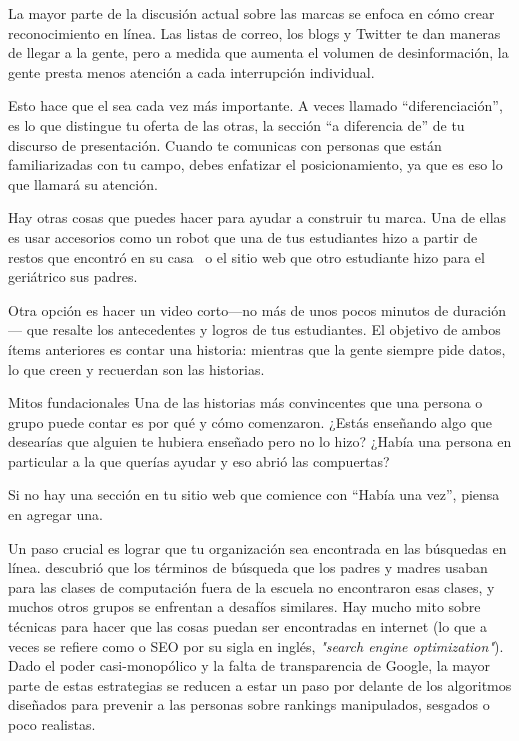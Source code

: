 La mayor parte de la discusión actual sobre las marcas se enfoca 
en cómo crear reconocimiento en línea.
Las listas de correo,
los blogs
y Twitter te dan maneras de llegar a la gente,
pero a medida que aumenta el volumen de desinformación,
la gente presta menos atención a cada interrupción individual.

Esto hace que el  sea cada vez más importante.
A veces llamado ``diferenciación'',
es lo que distingue tu oferta de las otras, la sección ``a diferencia de'' de tu discurso de presentación.
Cuando te comunicas con personas que están familiarizadas con tu campo,
debes enfatizar el  posicionamiento,
ya que es eso lo que  llamará su atención.

Hay otras cosas que puedes hacer para ayudar a construir tu marca.
Una de ellas es usar accesorios como un robot que una de tus estudiantes hizo a partir de restos que encontró en su casa~\cite{Schw2013}
o el sitio web que otro estudiante hizo para el geriátrico sus padres.

Otra opción es hacer un video corto---no más de unos pocos minutos de duración---
que resalte los antecedentes y logros de tus estudiantes.
El objetivo de ambos ítems anteriores es contar una historia:
mientras que la gente siempre pide datos,
lo que creen y recuerdan son las historias.

\begin{aside}{Mitos fundacionales}
Una de las historias más convincentes que una persona o grupo puede contar es
por qué y cómo comenzaron.
¿Estás enseñando algo que desearías que alguien te hubiera enseñado pero no lo hizo?
¿Había una persona en particular a la que querías ayudar
y eso abrió las compuertas?

Si no hay una sección en tu sitio web que comience con “Había una vez”,
piensa en agregar una.
\end{aside}

Un paso crucial es lograr que tu organización sea encontrada en las búsquedas en línea. 
\cite{DiSa2014b} descubrió que
los términos de búsqueda que los padres y madres usaban para las clases de computación fuera de la escuela no encontraron esas clases, 
y muchos otros grupos se enfrentan a desafíos similares.
Hay mucho mito sobre técnicas para hacer que las cosas puedan ser encontradas en internet (lo que a veces se refiere como o SEO por su sigla en inglés, \emph{"search engine optimization"}). 
Dado el poder casi-monopólico y la falta de transparencia de Google,
la mayor parte de estas estrategias se reducen a estar un paso por delante de los
algoritmos diseñados para prevenir a las personas sobre rankings manipulados, sesgados o poco realistas.


